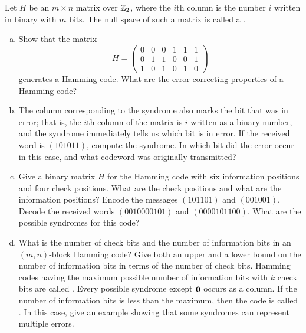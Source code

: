\begin{exercise}{}
Let $H$ be an $m \times n$ matrix over ${\Bbb Z}_2$, where the $i$th
column is the number $i$ written in binary with $m$ bits. The null
space of such a matrix is called a . 

\begin{enumerate}[(a)]
\item
Show  that the matrix
\[
H =
\left(
\begin{array}{cccccc}
0 & 0 & 0 & 1 & 1 & 1 \\
0 & 1 & 1 & 0 & 0 & 1 \\
1 & 0 & 1 & 0 & 1 & 0
\end{array}
\right)
\]
generates a Hamming code. What are the error-correcting properties of
a Hamming code? 
 
\item
The column corresponding to the syndrome also marks the bit that was
in error; that is, the $i$th column of the matrix is $i$ written as a
binary number, and the syndrome 
immediately tells us which bit is in error. If the received word is 
$(101011)$, compute the syndrome.  In
which bit did the error occur in this case, and what codeword was
originally transmitted?
 
\item
Give a binary matrix $H$ for the Hamming code with six information
positions and four check positions. What are the check positions and
what are the information positions? Encode the messages $(101101)$ and
$(001001)$. Decode the received words $(0010000101)$ and
$(0000101100)$.  What are the possible syndromes for this code?
 
\item
What is the number of check bits and the number of information bits in an
$(m,n)$-block Hamming code? Give both an upper and a lower bound on the
number of information bits in terms of the number of check bits.
Hamming codes having the maximum possible number of information bits
with $k$ check bits are called . Every possible syndrome except
${\bold 0}$ occurs as a column. If the number of information bits is
less than the maximum, then the code is called . In this case, give an example
showing that some syndromes can represent multiple errors.  
 
\end{enumerate}
 \end{exercise}

